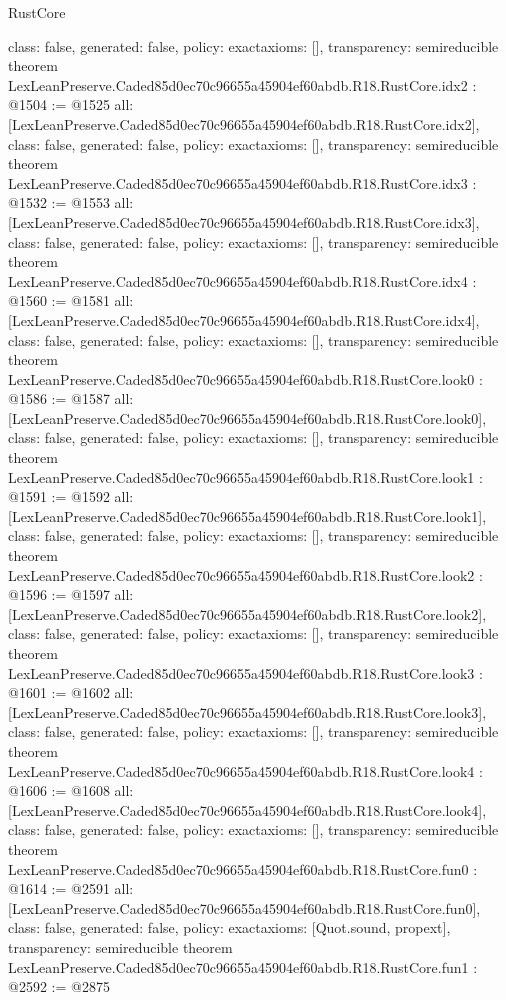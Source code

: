 \begin{lexlean}{RustCore}
\begin{coremodule}
{  class: false,
  generated: false,
  policy: exact{axioms: []},
  transparency: semireducible
}
theorem LexLeanPreserve.Caded85d0ec70c96655a45904ef60abdb.R18.RustCore.idx2 : @1504 := @1525 {
  all: [LexLeanPreserve.Caded85d0ec70c96655a45904ef60abdb.R18.RustCore.idx2],
  class: false,
  generated: false,
  policy: exact{axioms: []},
  transparency: semireducible
}
theorem LexLeanPreserve.Caded85d0ec70c96655a45904ef60abdb.R18.RustCore.idx3 : @1532 := @1553 {
  all: [LexLeanPreserve.Caded85d0ec70c96655a45904ef60abdb.R18.RustCore.idx3],
  class: false,
  generated: false,
  policy: exact{axioms: []},
  transparency: semireducible
}
theorem LexLeanPreserve.Caded85d0ec70c96655a45904ef60abdb.R18.RustCore.idx4 : @1560 := @1581 {
  all: [LexLeanPreserve.Caded85d0ec70c96655a45904ef60abdb.R18.RustCore.idx4],
  class: false,
  generated: false,
  policy: exact{axioms: []},
  transparency: semireducible
}
theorem LexLeanPreserve.Caded85d0ec70c96655a45904ef60abdb.R18.RustCore.look0 : @1586 := @1587 {
  all: [LexLeanPreserve.Caded85d0ec70c96655a45904ef60abdb.R18.RustCore.look0],
  class: false,
  generated: false,
  policy: exact{axioms: []},
  transparency: semireducible
}
theorem LexLeanPreserve.Caded85d0ec70c96655a45904ef60abdb.R18.RustCore.look1 : @1591 := @1592 {
  all: [LexLeanPreserve.Caded85d0ec70c96655a45904ef60abdb.R18.RustCore.look1],
  class: false,
  generated: false,
  policy: exact{axioms: []},
  transparency: semireducible
}
theorem LexLeanPreserve.Caded85d0ec70c96655a45904ef60abdb.R18.RustCore.look2 : @1596 := @1597 {
  all: [LexLeanPreserve.Caded85d0ec70c96655a45904ef60abdb.R18.RustCore.look2],
  class: false,
  generated: false,
  policy: exact{axioms: []},
  transparency: semireducible
}
theorem LexLeanPreserve.Caded85d0ec70c96655a45904ef60abdb.R18.RustCore.look3 : @1601 := @1602 {
  all: [LexLeanPreserve.Caded85d0ec70c96655a45904ef60abdb.R18.RustCore.look3],
  class: false,
  generated: false,
  policy: exact{axioms: []},
  transparency: semireducible
}
theorem LexLeanPreserve.Caded85d0ec70c96655a45904ef60abdb.R18.RustCore.look4 : @1606 := @1608 {
  all: [LexLeanPreserve.Caded85d0ec70c96655a45904ef60abdb.R18.RustCore.look4],
  class: false,
  generated: false,
  policy: exact{axioms: []},
  transparency: semireducible
}
theorem LexLeanPreserve.Caded85d0ec70c96655a45904ef60abdb.R18.RustCore.fun0 : @1614 := @2591 {
  all: [LexLeanPreserve.Caded85d0ec70c96655a45904ef60abdb.R18.RustCore.fun0],
  class: false,
  generated: false,
  policy: exact{axioms: [Quot.sound, propext]},
  transparency: semireducible
}
theorem LexLeanPreserve.Caded85d0ec70c96655a45904ef60abdb.R18.RustCore.fun1 : @2592 := @2875 {
}
\end{coremodule}
\end{lexlean}
